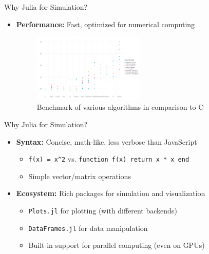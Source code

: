 \begin{frame}{Why Julia for Simulation?}
    \begin{itemize}
        \item \textbf{Performance:} Fast, optimized for numerical computing
              \begin{figure}
                  \centering
                  \includegraphics[width=0.5\textwidth]{../paper/figures/julia_benchmark}
                  \caption{Benchmark of various algorithms in comparison to C \footnotemark}
              \end{figure}
    \end{itemize}
\end{frame}

\begin{frame}{Why Julia for Simulation?}
    \begin{itemize}
        \item \textbf{Syntax:} Concise, math-like, less verbose than JavaScript
              \begin{itemize}
                  \item \texttt{f(x) = x\^{}2} vs. \texttt{function f(x) return x * x end}
                  \item Simple vector/matrix operations
              \end{itemize}
              \vspace{2em}
        \item \textbf{Ecosystem:} Rich packages for simulation and visualization
              \begin{itemize}
                  \item \texttt{Plots.jl} for plotting (with different backends)
                  \item \texttt{DataFrames.jl} for data manipulation
                  \item Built-in support for parallel computing (even on GPUs)
              \end{itemize}
    \end{itemize}
\end{frame}


